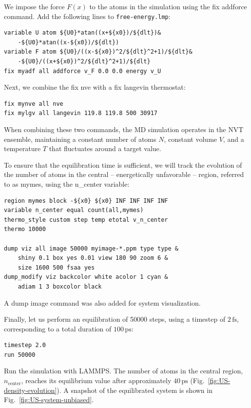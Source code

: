 \documentclass[9pt,tutorial]{livecoms}
\newcommand{\lmpcmd}[1]{\hspace{0pt}\colorbox{listing}{\textcolor{command}{\small{#1}}}\hspace{0pt}} %
\newcommand{\flecmd}[1]{\textcolor{command}{\texttt{#1}}} %
\begin{document}
We impose the force $F(x)$ to the atoms in the simulation
using the \lmpcmd{fix addforce} command.  Add the following
lines to \flecmd{free-energy.lmp}:
\begin{lstlisting}
variable U atom ${U0}*atan((x+${x0})/${dlt})&
    -${U0}*atan((x-${x0})/${dlt})
variable F atom ${U0}/((x-${x0})^2/${dlt}^2+1)/${dlt}&
    -${U0}/((x+${x0})^2/${dlt}^2+1)/${dlt}
fix myadf all addforce v_F 0.0 0.0 energy v_U
\end{lstlisting}
Next, we combine the \lmpcmd{fix nve} with a \lmpcmd{fix langevin} thermostat:
\begin{lstlisting}
fix mynve all nve
fix mylgv all langevin 119.8 119.8 500 30917
\end{lstlisting}
When combining these two commands, the MD simulation operates
in the NVT ensemble, maintaining a constant number of
atoms $N$, constant volume $V$, and a temperature $T$ that
fluctuates around a target value.

To ensure that the equilibration time is sufficient, we will track the evolution of
the number of atoms in the central -- energetically unfavorable -- region,
referred to as \lmpcmd{mymes}, using the \lmpcmd{n\_center} variable:
\begin{lstlisting}
region mymes block -${x0} ${x0} INF INF INF INF
variable n_center equal count(all,mymes)
thermo_style custom step temp etotal v_n_center
thermo 10000

dump viz all image 50000 myimage-*.ppm type type &
    shiny 0.1 box yes 0.01 view 180 90 zoom 6 &
    size 1600 500 fsaa yes
dump_modify viz backcolor white acolor 1 cyan &
    adiam 1 3 boxcolor black
\end{lstlisting}
A \lmpcmd{dump image} command was also added for system visualization.

Finally, let us perform an equilibration of 50000 steps,
using a timestep of $2\,\text{fs}$, corresponding to a total duration of $100\,\text{ps}$:
\begin{lstlisting}
timestep 2.0
run 50000
\end{lstlisting}
Run the simulation with LAMMPS.  The number of atoms in the
central region, $n_\mathrm{center}$, reaches its equilibrium value after approximately $40\,\text{ps}$
(Fig.~\ref{fig:US-density-evolution}).  A snapshot of the equilibrated system is shown in Fig.~\ref{fig:US-system-unbiased}.
\end{document}
